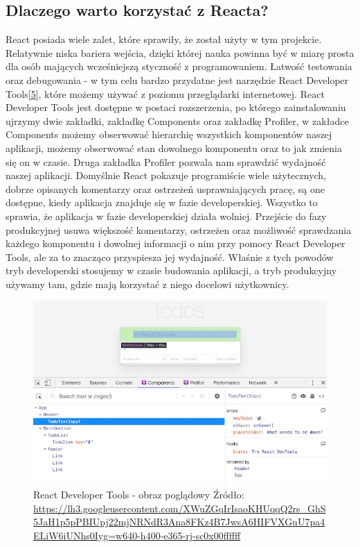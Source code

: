 \documentclass[oneside,polski,logo,indent]{amuthesis}
\begin{document}
\begin{enumerate}
\begin{enumerate}
\section{Dlaczego warto korzystać z Reacta?}{
React posiada wiele zalet, które sprawiły, że został użyty w tym projekcie. Relatywnie niska bariera wejścia, dzięki której nauka powinna być w miarę prosta dla osób mających wcześniejszą styczność z programowaniem. Łatwość testowania oraz debugowania - w tym celu bardzo przydatne jest narzędzie React Developer Tools\hyperlink{[5]}{[5]}, które możemy używać z poziomu przeglądarki internetowej. React Developer Tools jest dostępne w postaci rozszerzenia, po którego zainstalowaniu ujrzymy dwie zakładki, zakładkę Components oraz zakładkę Profiler, w zakładce Components możemy obserwować hierarchię wszystkich komponentów naszej aplikacji, możemy obserwować stan dowolnego komponentu oraz to jak zmienia się on w czasie. Druga zakładka Profiler pozwala nam sprawdzić wydajność naszej aplikacji. Domyślnie React pokazuje programiście wiele użytecznych, dobrze opisanych komentarzy oraz ostrzeżeń usprawniających pracę, są one dostępne, kiedy aplikacja znajduje się w fazie developerskiej. Wszystko to sprawia, że aplikacja w fazie developerskiej działa wolniej. Przejście do fazy produkcyjnej usuwa większość komentarzy, ostrzeżen oraz możliwość sprawdzania każdego komponentu i dowolnej informacji o nim przy pomocy React Developer Tools, ale za to znacząco przyspiesza jej wydajność.
Właśnie z tych powodów tryb developerski stosujemy w czasie budowania aplikacji, a tryb produkcyjny używamy tam, gdzie mają korzystać z niego docelowi użytkownicy.



\begin{figure}[H]
\centering
\includegraphics[width=13cm]{react dev example.jpg}
\caption{React Developer Tools - obraz poglądowy
\newline
Źródło: \url{https://lh3.googleusercontent.com/XWuZGqIrIsaoKHUqqQ2rs_GhS5JaH1p5pPBIUpj22mjNRNdR3Ana8FKz4B7JwsA6HIFVXGuU7pa4ELiW6iUNhs0Iyg=w640-h400-e365-rj-sc0x00ffffff}
}
\label{react dev example.jpg}
\end{figure}

}
\end{enumerate}
\end{enumerate}
\end{document}
